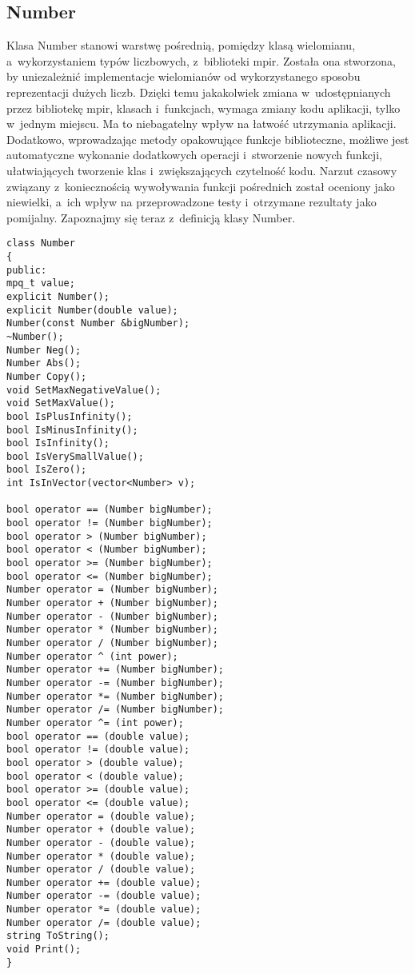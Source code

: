 \subsection{Number}
Klasa Number stanowi warstwę pośrednią, pomiędzy klasą wielomianu, a~wykorzystaniem typów liczbowych, z~biblioteki mpir. Została ona stworzona, by uniezależnić implementacje wielomianów od wykorzystanego sposobu reprezentacji dużych liczb. Dzięki temu jakakolwiek zmiana w~udostępnianych przez bibliotekę mpir, klasach i~funkcjach, wymaga zmiany kodu aplikacji, tylko w~jednym miejscu. Ma to niebagatelny wpływ na łatwość utrzymania aplikacji. Dodatkowo, wprowadzając metody opakowujące funkcje biblioteczne, możliwe jest automatyczne wykonanie dodatkowych operacji i~stworzenie nowych funkcji, ułatwiających tworzenie klas i~zwiększających czytelność kodu. Narzut czasowy związany z~koniecznością wywoływania funkcji pośrednich został oceniony jako niewielki, a~ich wpływ na przeprowadzone testy i~otrzymane rezultaty jako pomijalny. Zapoznajmy się teraz z~definicją klasy Number.

\begin{lstlisting}
class Number
{
public:
mpq_t value;
explicit Number();
explicit Number(double value);
Number(const Number &bigNumber);
~Number();
Number Neg();
Number Abs();
Number Copy();
void SetMaxNegativeValue();
void SetMaxValue();
bool IsPlusInfinity();
bool IsMinusInfinity();
bool IsInfinity();
bool IsVerySmallValue();
bool IsZero();
int IsInVector(vector<Number> v);

bool operator == (Number bigNumber);
bool operator != (Number bigNumber);
bool operator > (Number bigNumber);
bool operator < (Number bigNumber);
bool operator >= (Number bigNumber);
bool operator <= (Number bigNumber);
Number operator = (Number bigNumber);
Number operator + (Number bigNumber);
Number operator - (Number bigNumber);
Number operator * (Number bigNumber);
Number operator / (Number bigNumber);
Number operator ^ (int power);
Number operator += (Number bigNumber);
Number operator -= (Number bigNumber);
Number operator *= (Number bigNumber);
Number operator /= (Number bigNumber);
Number operator ^= (int power);
bool operator == (double value);
bool operator != (double value);
bool operator > (double value);
bool operator < (double value);
bool operator >= (double value);
bool operator <= (double value);
Number operator = (double value);
Number operator + (double value);
Number operator - (double value);
Number operator * (double value);
Number operator / (double value);
Number operator += (double value);
Number operator -= (double value);
Number operator *= (double value);
Number operator /= (double value);
string ToString();
void Print();
}
\end{lstlisting}

